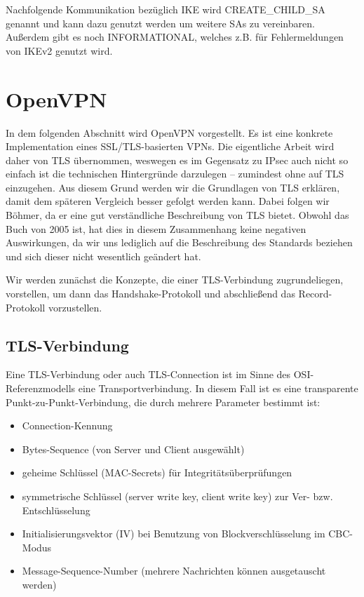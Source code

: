 \documentclass[12pt]{scrartcl}
\begin{document}
Nachfolgende Kommunikation bezüglich IKE wird CREATE\_CHILD\_SA genannt und kann dazu genutzt werden um weitere SAs zu vereinbaren. Außerdem gibt es noch INFORMATIONAL, welches z.B. für Fehlermeldungen von IKEv2 genutzt wird.
\section{OpenVPN}

In dem folgenden Abschnitt wird OpenVPN vorgestellt. Es ist eine konkrete Implementation eines SSL/TLS-basierten VPNs. Die eigentliche Arbeit wird daher von TLS übernommen, weswegen es im Gegensatz zu IPsec auch nicht so einfach ist die technischen Hintergründe darzulegen -- zumindest ohne auf TLS einzugehen. Aus diesem Grund werden wir die Grundlagen von TLS erklären, damit dem späteren Vergleich besser gefolgt werden kann. Dabei folgen wir Böhmer\cite{Boehmer2005}, da er eine gut verständliche Beschreibung von TLS bietet. Obwohl das Buch von 2005 ist, hat dies in diesem Zusammenhang keine negativen Auswirkungen, da wir uns lediglich auf die Beschreibung des Standards beziehen und sich dieser nicht wesentlich geändert hat.

Wir werden zunächst die Konzepte, die einer TLS-Verbindung zugrundeliegen, vorstellen, um dann das Handshake-Protokoll und abschließend das Record-Protokoll vorzustellen.

\subsection{TLS-Verbindung}

Eine TLS-Verbindung oder auch TLS-Connection ist im Sinne des OSI-Referenzmodells eine Transportverbindung. In diesem Fall ist es eine transparente Punkt-zu-Punkt-Verbindung, die durch mehrere Parameter bestimmt ist:

\begin{itemize}
	\item Connection-Kennung
	\item Bytes-Sequence (von Server und Client ausgewählt)
	\item geheime Schlüssel (MAC-Secrets) für Integritätsüberprüfungen
	\item symmetrische Schlüssel (server write key, client write key) zur Ver- bzw. Entschlüsselung
	\item Initialisierungsvektor (IV) bei Benutzung von Blockverschlüsselung im CBC-Modus
	\item Message-Sequence-Number (mehrere Nachrichten können ausgetauscht werden)
\end{itemize}
\end{document}
